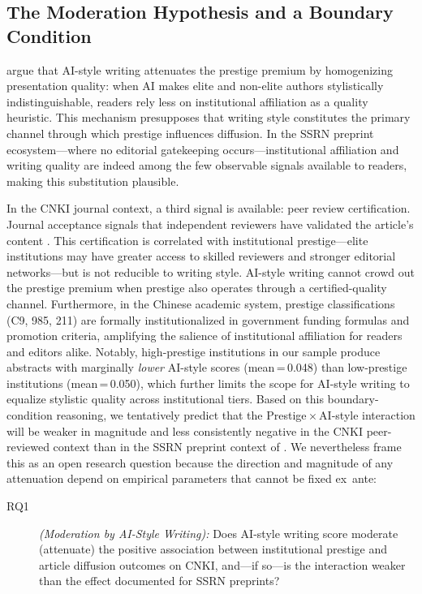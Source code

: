 \documentclass[12pt,a4paper]{article}
\begin{document}
\subsection{The Moderation Hypothesis and a Boundary Condition}

\citet{JoLi2026} argue that AI-style writing attenuates the prestige
premium by homogenizing presentation quality: when AI makes elite and
non-elite authors stylistically indistinguishable, readers rely less
on institutional affiliation as a quality heuristic.
This mechanism presupposes that writing style constitutes the primary
channel through which prestige influences diffusion.
In the SSRN preprint ecosystem---where no editorial gatekeeping
occurs---institutional affiliation and writing quality are indeed
among the few observable signals available to readers, making this
substitution plausible.

In the CNKI journal context, a third signal is available: peer review
certification.
Journal acceptance signals that independent reviewers have validated
the article's content \citep{Bornmann2008}.
This certification is correlated with institutional prestige---elite
institutions may have greater access to skilled reviewers and stronger
editorial networks---but is not reducible to writing style.
AI-style writing cannot crowd out the prestige premium when prestige
also operates through a certified-quality channel.
Furthermore, in the Chinese academic system, prestige classifications
(C9, 985, 211) are formally institutionalized in government funding
formulas and promotion criteria, amplifying the salience of
institutional affiliation for readers and editors alike.
Notably, high-prestige institutions in our sample produce abstracts
with marginally \textit{lower} AI-style scores (mean\,=\,0.048)
than low-prestige institutions (mean\,=\,0.050), which further
limits the scope for AI-style writing to equalize stylistic quality
across institutional tiers.
Based on this boundary-condition reasoning, we tentatively predict
that the Prestige\,$\times$\,AI-style interaction will be weaker in
magnitude and less consistently negative in the CNKI peer-reviewed
context than in the SSRN preprint context of \citet{JoLi2026}.
We nevertheless frame this as an open research question because the
direction and magnitude of any attenuation depend on empirical
parameters that cannot be fixed ex~ante:
\begin{description}
  \item[RQ1] \textit{(Moderation by AI-Style Writing):}
  Does AI-style writing score moderate (attenuate) the positive
  association between institutional prestige and article diffusion
  outcomes on CNKI, and---if so---is the interaction weaker than
  the effect documented for SSRN preprints?
\end{description}
\end{document}
